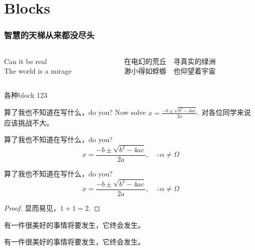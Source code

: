 \documentclass[aspectratio=1610,linespread=1.4,t]{ctexbeamer}
\begin{document}
\section{Blocks}

\begin{frame}[c]
\frametitle{智慧的天梯从来都没尽头}
\begin{columns}
\begin{column}{.4\textwidth}
\begin{pullquote}
    Can it be real\\
    The world is a mirage
\end{pullquote}
\end{column}

\begin{column}{.53\textwidth}
\renewcommand{\MiragePullquoteOpen}{\hskip-.2\ccwd『}
\begin{pullquote}
在电幻的荒丘　寻真实的绿洲\\
渺小得如蜉蝣　也仰望着宇宙
\end{pullquote}
\end{column}
\end{columns}
\end{frame}



\begin{frame}[allowframebreaks]{各种block 123}

    \begin{exampleblock}{算了我也不知道在写什么，do you?}
    Now solve $x = \frac{-b \pm \sqrt{b^2 -4ac}}{2a}$. 对各位同学来说应该挑战不大。
    \end{exampleblock}

    \begin{alertblock}{算了我也不知道在写什么，do you?}
    \[ x = \frac{-b \pm \sqrt{b^2 -4ac}}{2a}, \quad\therefore \alpha \neq \Omega \]
    \end{alertblock}

    \begin{block}{算了我也不知道在写什么，do you?}
    \[ x = \frac{-b \pm \sqrt{b^2 -4ac}}{2a}, \quad\therefore \alpha \neq \Omega \]
    \end{block}
    
    \begin{proof}
    显而易见，$1+1=2$.
    \end{proof}

    \begin{theorem}
    有一件很美好的事情将要发生，它终会发生。
    \end{theorem}
    
    \begin{definition}
    有一件很美好的事情将要发生，它终会发生。
    \end{definition}
\end{frame}
\end{document}

